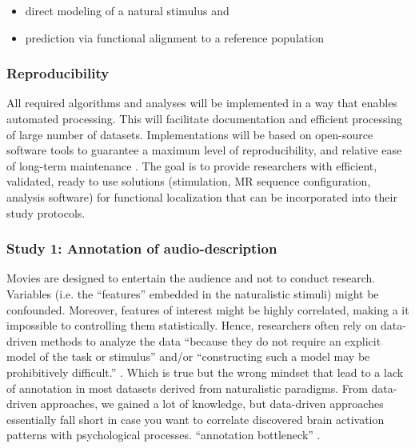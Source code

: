 \begin{itemize}
    \item direct modeling of a natural stimulus and
    \item prediction via functional alignment to a reference population
\end{itemize}


\subsubsection{Reproducibility}

%
All required algorithms and analyses will be implemented in a way that enables
automated processing.
%
This will facilitate documentation and efficient processing of large number of
datasets.
%
Implementations will be based on open-source software tools to guarantee a
maximum level of reproducibility, and relative ease of long-term maintenance
\citep{eglen2017toward}.
%
The goal is to provide researchers with efficient, validated, ready to use
solutions (stimulation, MR sequence configuration, analysis software) for
functional localization that can be incorporated into their study protocols.


\subsubsection{Study 1: Annotation of audio-description}



%
Movies are designed to entertain the audience and not to conduct research.
%
Variables (i.e. the ``features'' embedded in the naturalistic stimuli) might be
confounded.
%
Moreover, features of interest might be highly correlated, making a it
impossible to controlling them statistically.
%
Hence, researchers often rely on data-driven methods to analyze the data
``because they do not require an explicit model of the task or stimulus'' and/or
``constructing such a model may be prohibitively difficult.''
\citep{nastase2019measuring}.
%
Which is true but the wrong mindset that lead to a lack of annotation in most
datasets derived from naturalistic paradigms.
%
From data-driven approaches, we gained a lot of knowledge, but data-driven
approaches essentially fall short in case you want to correlate discovered brain
activation patterns with psychological processes.
%
``annotation bottleneck'' \citep{aliko2020naturalistic}.


